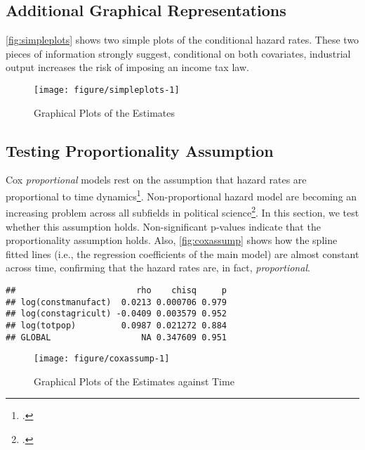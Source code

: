 \documentclass[onesided]{article}\usepackage[]{graphicx}\usepackage[]{color}
\makeatletter
\def\maxwidth{ %
  \ifdim\Gin@nat@width>\linewidth
    \linewidth
  \else
    \Gin@nat@width
  \fi
}
\newenvironment{kframe}{%
 \def\at@end@of@kframe{}%
 \ifinner\ifhmode%
  \def\at@end@of@kframe{\end{minipage}}%
  \begin{minipage}{\columnwidth}%
 \fi\fi%
 \def\FrameCommand##1{\hskip\@totalleftmargin \hskip-\fboxsep
 \colorbox{shadecolor}{##1}\hskip-\fboxsep
     \hskip-\linewidth \hskip-\@totalleftmargin \hskip\columnwidth}%
 \MakeFramed {\advance\hsize-\width
   \@totalleftmargin\z@ \linewidth\hsize
   \@setminipage}}%
 {\par\unskip\endMakeFramed%
 \at@end@of@kframe}
\newenvironment{knitrout}{}{} %
\makeatother
\begin{document}
\subsection{Additional Graphical Representations}

\autoref{fig:simpleplots} shows two simple plots of the conditional hazard rates. These two pieces of information strongly suggest, conditional on both covariates, industrial output increases the risk of imposing an income tax law.

\begin{knitrout}
\color{fgcolor}\begin{figure}[H]

{\centering \texttt{[image: figure/simpleplots-1]} 

}

\caption[Graphical Plots of the Estimates]{Graphical Plots of the Estimates}\label{fig:simpleplots}
\end{figure}


\end{knitrout}

\subsection{Testing Proportionality Assumption}

Cox \emph{proportional} models rest on the assumption that hazard rates are proportional to time dynamics\footnote{\citet{Box-Steffensmeier2004}.}. Non-proportional hazard model are becoming an increasing problem across all subfields in political science\footnote{\citet{Licht2011}.}. In this section, we test whether this assumption holds. Non-significant p-values indicate that the proportionality assumption holds. Also, \autoref{fig:coxassump} shows how the spline fitted lines (i.e., the regression coefficients of the main model) are almost constant across time, confirming that the hazard rates are, in fact, \emph{proportional}.

\begin{knitrout}
\color{fgcolor}\begin{kframe}
\begin{verbatim}
##                        rho    chisq     p
## log(constmanufact)  0.0213 0.000706 0.979
## log(constagricult) -0.0409 0.003579 0.952
## log(totpop)         0.0987 0.021272 0.884
## GLOBAL                  NA 0.347609 0.951
\end{verbatim}
\end{kframe}\begin{figure}[H]

{\centering \texttt{[image: figure/coxassump-1]} 

}

\caption[Graphical Plots of the Estimates against Time]{Graphical Plots of the Estimates against Time}\label{fig:coxassump}
\end{figure}


\end{knitrout}
\end{document}
